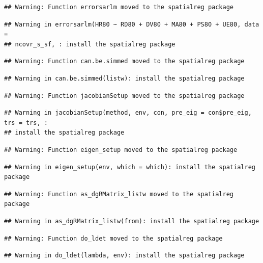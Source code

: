 \documentclass[]{book}
\begin{document}
\begin{verbatim}
## Warning: Function errorsarlm moved to the spatialreg package
\end{verbatim}

\begin{verbatim}
## Warning in errorsarlm(HR80 ~ RD80 + DV80 + MA80 + PS80 + UE80, data =
## ncovr_s_sf, : install the spatialreg package
\end{verbatim}

\begin{verbatim}
## Warning: Function can.be.simmed moved to the spatialreg package
\end{verbatim}

\begin{verbatim}
## Warning in can.be.simmed(listw): install the spatialreg package
\end{verbatim}

\begin{verbatim}
## Warning: Function jacobianSetup moved to the spatialreg package
\end{verbatim}

\begin{verbatim}
## Warning in jacobianSetup(method, env, con, pre_eig = con$pre_eig, trs = trs, :
## install the spatialreg package
\end{verbatim}

\begin{verbatim}
## Warning: Function eigen_setup moved to the spatialreg package
\end{verbatim}

\begin{verbatim}
## Warning in eigen_setup(env, which = which): install the spatialreg package
\end{verbatim}

\begin{verbatim}
## Warning: Function as_dgRMatrix_listw moved to the spatialreg package
\end{verbatim}

\begin{verbatim}
## Warning in as_dgRMatrix_listw(from): install the spatialreg package
\end{verbatim}

\begin{verbatim}
## Warning: Function do_ldet moved to the spatialreg package
\end{verbatim}

\begin{verbatim}
## Warning in do_ldet(lambda, env): install the spatialreg package
\end{verbatim}
\end{document}
